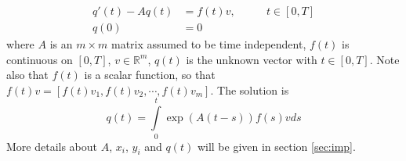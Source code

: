 \begin{equation} \label{eqn:numheat}
\begin{aligned}
q'(t) -Aq(t) &= f(t) v, \qquad & t \in [0,T] \\
q(0) &= 0               
\end{aligned}
\end{equation}
where $A$ is an $m \times m$ matrix assumed to be time independent, $f(t)$ is continuous on $[0,T]$, $v \in \mathbb{R}^m$, $q(t)$ is the unknown vector with $t \in [0,T]$. Note also that $f(t)$ is a scalar function, so that $f(t) v = [f(t)v_1,f(t)v_2, \cdots,f(t) v_m] $.
The solution is 
\begin{equation}
q(t) = \int \limits_0^t \exp(A(t-s))f(s)v ds
\end{equation}
More details about $A$, $x_i$, $y_i$ and $q(t)$ will be given in section \ref{sec:imp}.
